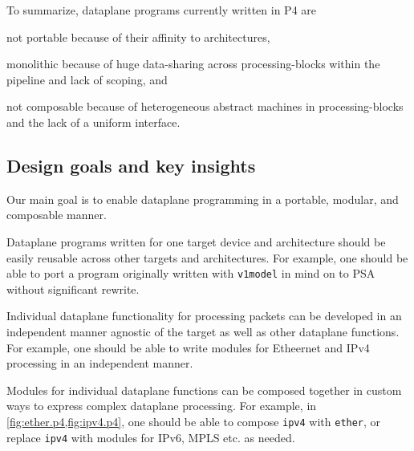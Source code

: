 \documentclass[letterpaper,twocolumn,10pt]{article}
\begin{document}
To summarize, dataplane programs currently written in P4 are
\begin{enumerate*}[label=(\roman*)]
  \item not portable because of their affinity to architectures,
  \item monolithic because of huge data-sharing across
    processing-blocks within the pipeline and lack of scoping, and
  \item not composable because of heterogeneous abstract machines
    in processing-blocks and the lack of a uniform interface.
\end{enumerate*}




\subsection{Design goals and key insights}
\label{sec:goals}
\label{sec:insights}

Our main goal is to enable dataplane programming in a portable,
modular, and composable manner.

 Dataplane programs written for one target device
and architecture should be easily reusable across other targets and
architectures. For example, one should be able to port a program
originally written with \texttt{v1model} in mind on to PSA without
significant rewrite.

 Individual dataplane functionality for processing
packets can be developed in an independent manner agnostic of the
target as well as other dataplane functions. For example, one should
be able to write modules for Etheernet and IPv4 processing in an independent
manner.

 Modules for individual dataplane functions can
be composed together in custom ways to express complex dataplane
processing. For example, in \cref{fig:ether.p4,fig:ipv4.p4}, one should
be able to compose \texttt{ipv4} with \texttt{ether}, or replace
\texttt{ipv4} with modules for IPv6, MPLS etc. as needed.
\end{document}
